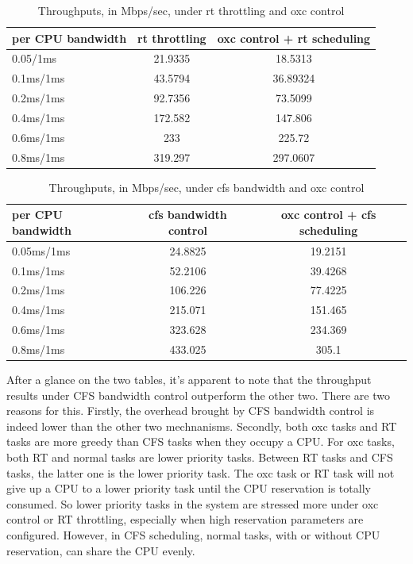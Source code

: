 \begin{table}[H]%
	\centering
	\begin{tabular}{|l||c|c|}\hline
		 per CPU bandwidth & rt throttling & oxc control + rt scheduling\\\hline
			0.05/1ms &	21.9335	&	18.5313	\\\hline 
			0.1ms/1ms &	43.5794 &	36.89324 \\\hline
			0.2ms/1ms &	92.7356 &	73.5099	\\\hline
			0.4ms/1ms &	172.582 &	147.806 \\\hline
			0.6ms/1ms &	233	&	225.72	\\\hline
			0.8ms/1ms &	319.297 &	297.0607	\\\hline
	\end{tabular}
	\caption{Throughputs, in Mbps/sec, under rt throttling and oxc control}
	\label{tab:expB1}
\end{table}
\begin{table}[H]%
	\centering
	\begin{tabular}{|l||c|c|}\hline
		 per CPU bandwidth & cfs bandwidth control & oxc control + cfs scheduling  \\\hline
		 0.05ms/1ms	& 24.8825	& 19.2151 \\\hline
		 0.1ms/1ms	& 52.2106	& 39.4268 \\\hline
		 0.2ms/1ms	& 106.226	& 77.4225 \\\hline
		 0.4ms/1ms	& 215.071	& 151.465 \\\hline
		 0.6ms/1ms	& 323.628	& 234.369 \\\hline
		 0.8ms/1ms	& 433.025	& 305.1 \\\hline
	\end{tabular}
	\caption{Throughputs, in Mbps/sec, under cfs bandwidth and oxc control}
	\label{tab:expB2}
\end{table}

After a glance on the two tables, it's apparent to note that the 
throughput results under CFS bandwidth control outperform the other two. 
There are two reasons for this. Firstly, the overhead brought by CFS 
bandwidth control is indeed lower than the other two mechnanisms.
Secondly, both oxc tasks and RT tasks are more greedy than CFS tasks when 
they occupy a CPU. For oxc tasks, both RT and normal tasks are lower
priority tasks. Between RT tasks and CFS tasks, the latter one is the 
lower priority task. The oxc task or RT task will not give up a CPU to 
a lower priority task until the CPU reservation is totally consumed. So 
lower priority tasks in the system are stressed more under oxc control 
or RT throttling, especially when high reservation parameters are configured. 
However, in CFS scheduling, normal tasks, with or without CPU reservation, 
can share the CPU evenly.

